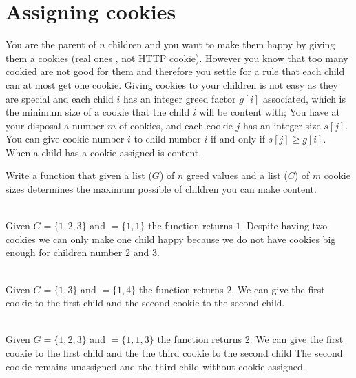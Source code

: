 \section{Assigning cookies \faCookie}
\begin{exercise}
    You are the parent of $n$ children and you want to make them happy by giving them a cookies (real ones  \faCookieBite, not HTTP cookie). 
    However you know that too many cookied are not good for them and therefore you settle for a rule that each child can at most get one cookie.
    Giving cookies to your children is not easy as they are special and each child $i$ has an integer greed factor $g[i]$ associated,
    which is the minimum size of a cookie that the child $i$ will be content with; 
    You have at your disposal a number $m$ of cookies, and each cookie $j$ has an integer size $s[j]$.
    You can give cookie number $i$ to child number $i$ if and only if $s[j] \ge g[i]$. When a child has a cookie assigned is content.
    
    Write a function that given a list  ($G$) of $n$ greed values and a list ($C$) of  $m$ cookie sizes determines the maximum possible of children you can make content.
     
    \begin{example}
        \label{ex:nary-treedepth:example1}
        \hfill \\
        Given $G=\{1,2,3\}$ and  $=\{1,1\}$ the function returns $1$. Despite having two cookies we can only make one child happy because we do not have cookies big enough for children number $2$ and $3$.
    \end{example}
    
    \begin{example}
        \label{ex:nary-treedepth:example2}
        \hfill \\
        Given $G=\{1,3\}$ and  $=\{1,4\}$ the function returns $2$. We can give the first cookie to the first child and the second cookie to the second child.
    \end{example}


    \begin{example}
        \label{ex:nary-treedepth:example3}
        \hfill \\
        Given $G=\{1,2,3\}$ and  $=\{1,1,3\}$ the function returns $2$. We can give the first cookie to the first child and the the third cookie to the second child The second cookie remains unassigned and the third child without cookie assigned.
    \end{example}
    \end{exercise}
 

